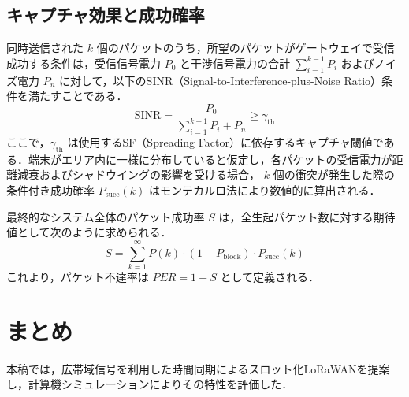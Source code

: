 \documentclass[twocolumn,a4paper,dvipdfmx]{ieicejsp}
\begin{document}
\subsection{キャプチャ効果と成功確率}
同時送信された $k$ 個のパケットのうち，所望のパケットがゲートウェイで受信成功する条件は，受信信号電力 $P_0$ と干渉信号電力の合計 $\sum_{i=1}^{k-1} P_i$ およびノイズ電力 $P_n$ に対して，以下のSINR（Signal-to-Interference-plus-Noise Ratio）条件を満たすことである．
\begin{equation}
    \text{SINR} = \frac{P_0}{\sum_{i=1}^{k-1} P_i + P_n} \ge \gamma_{\text{th}}
\end{equation}
ここで，$\gamma_{\text{th}}$ は使用するSF（Spreading Factor）に依存するキャプチャ閾値である．端末がエリア内に一様に分布していると仮定し，各パケットの受信電力が距離減衰およびシャドウイングの影響を受ける場合， $k$ 個の衝突が発生した際の条件付き成功確率 $P_{\text{succ}}(k)$ はモンテカルロ法により数値的に算出される．

最終的なシステム全体のパケット成功率 $S$ は，全生起パケット数に対する期待値として次のように求められる．
\begin{equation}
    S = \sum_{k=1}^{\infty} P(k) \cdot (1 - P_{\text{block}}) \cdot P_{\text{succ}}(k)
\end{equation}
これより，パケット不達率は $PER = 1 - S$ として定義される．

\section{まとめ}
本稿では，広帯域信号を利用した時間同期によるスロット化LoRaWANを提案し，計算機シミュレーションによりその特性を評価した．

\begingroup
\scriptsize


\endgroup
\end{document}
